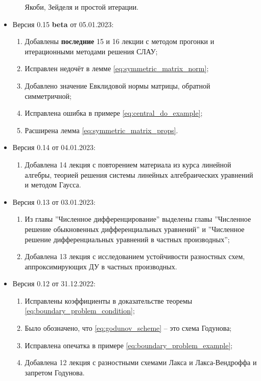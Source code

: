 \documentclass{article}
\begin{document}
\begin{itemize}[nosep]
\begin{enumerate}[nosep]
			Якоби, Зейделя и простой итерации.
	\end{enumerate}
\item Версия 0.15 \textbf{beta} от 05.01.2023:
	\begin{enumerate}[nosep]
		\item Добавлены \textbf{последние} 15 и 16 лекции с методом
			прогонки и итерационными методами решения СЛАУ;
		\item Исправлен недочёт в лемме
			\eqref{eq:symmetric_matrix_norm};
		\item Добавлено значение Евклидовой нормы матрицы, обратной
			симметричной;
		\item Исправлена ошибка в примере \eqref{eq:central_do_example};
		\item Расширена лемма \eqref{eq:symmetric_matrix_props}.
	\end{enumerate}
\item Версия 0.14 от 04.01.2023:
	\begin{enumerate}[nosep]
		\item Добавлена 14 лекция с повторением материала из курса
			линейной алгебры, теорией решения системы линейных
			алгебраических уравнений и методом Гаусса.
	\end{enumerate}
\item Версия 0.13 от 03.01.2023:
	\begin{enumerate}[nosep]
		\item Из главы ''Численное дифференцирование'' выделены главы
			''Численное решение обыкновенных дифференциальных
			уравнений'' и ''Численное решение дифференциальных
			уравнений в частных производных'';
		\item Добавлена 13 лекция с исследованием устойчивости
			разностных схем, аппроксимирующих ДУ в частных
			производных.
	\end{enumerate}
\item Версия 0.12 от 31.12.2022:
	\begin{enumerate}[nosep]
		\item Исправлены коэффициенты в доказательстве теоремы
			\eqref{eq:boundary_problem_condition};
		\item Было обозначено, что \eqref{eq:godunov_scheme} -- это
			схема Годунова;
		\item Исправлена опечатка в примере
			\eqref{eq:boundary_problem_example};
		\item Добавлена 12 лекция с разностными схемами Лакса и
			Лакса-Вендроффа и запретом Годунова.
	\end{enumerate}
\end{itemize}
\end{document}
